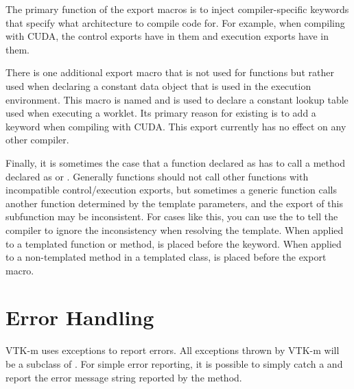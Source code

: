 
The primary function of the export macros is to inject compiler-specific
keywords that specify what architecture to compile code for. For example,
when compiling with CUDA, the control exports have
 in them and execution exports
have  in them.

There is one additional export macro that is not used for functions but
rather used when declaring a constant data object that is used in the
execution environment. This macro is named
and is used to declare a constant lookup table used when executing a
worklet. Its primary reason for existing is to add a
 keyword when compiling with CUDA. This export
currently has no effect on any other compiler.

Finally, it is sometimes the case that a function declared as
\vtkmexeccontexport has to call a method declared as \vtkmexecexport or
\vtkmcontexport. Generally functions should not call other functions with
incompatible control/execution exports, but sometimes a generic
\vtkmexeccontexport function calls another function determined by the
template parameters, and the export of this subfunction may be
inconsistent. For cases like this, you can use the
 to tell the compiler to ignore the
inconsistency when resolving the template. When applied to a templated
function or method,  is placed
before the  keyword. When applied to a non-templated
method in a templated class,  is
placed before the export macro.


\section{Error Handling}
\label{sec:ErrorHandlingControl}



VTK-m uses exceptions to report errors. All exceptions thrown by VTK-m will
be a subclass of . For simple error reporting, it is
possible to simply catch a  and report the error message
string reported by the  method.

